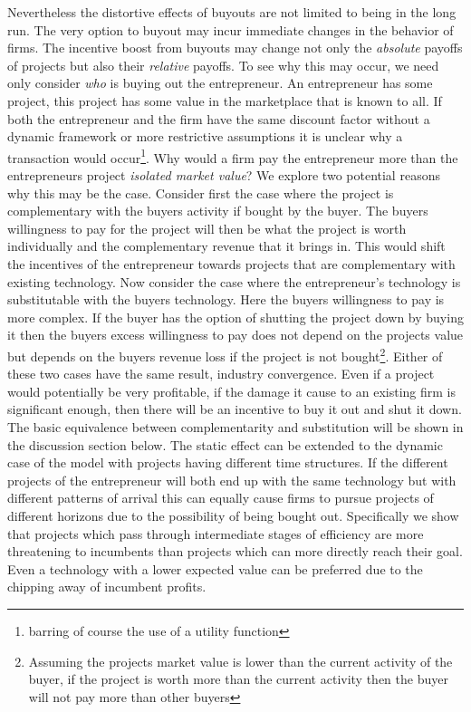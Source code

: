 \documentclass[12pt]{report}
\numberwithin{equation}{section}
\begin{document}
Nevertheless the distortive effects of buyouts are not limited to being in the long run. The very option to buyout may incur immediate changes in the behavior of firms. The incentive boost from buyouts may change not only the \textit{absolute} payoffs of projects but also their \textit{relative} payoffs. To see why this may occur, we need only consider \textit{who} is buying out the entrepreneur. An entrepreneur has some project, this project has some value in the marketplace that is known to all. If both the entrepreneur and the firm have the same discount factor without a dynamic framework or more restrictive assumptions it is unclear why a transaction would occur\footnote{barring of course the use of a utility function}. Why would a firm pay the entrepreneur more than the entrepreneurs project \textit{isolated market value}?  We explore two potential reasons why this may be the case.
Consider first the case where the project is complementary with the buyers activity if bought by the buyer. The buyers willingness to pay for the project will then be what the project is worth individually and the complementary revenue that it brings in. This would shift the incentives of the entrepreneur towards projects that are complementary with existing technology. 
Now consider the case where the entrepreneur's technology is substitutable with the buyers technology. Here the buyers willingness to pay is more complex. If the buyer has the option of shutting the project down by buying it then the buyers excess willingness to pay does not depend on the projects value but depends on the buyers revenue loss if the project is not bought\footnote{Assuming the projects market value is lower than the current activity of the buyer, if the project is worth more than the current activity then the buyer will not pay more than other buyers}.
Either of these two cases have the same result, industry convergence. Even if a project would potentially be very profitable, if the damage it cause to an existing firm is significant enough, then there will be an incentive to buy it out and shut it down. The basic equivalence between complementarity and substitution will be shown in the discussion section below. 
The static effect can be extended to the dynamic case of the model with projects having different time structures. If the different projects of the entrepreneur will both end up with the same technology but with different patterns of arrival this can equally cause firms to pursue projects of different horizons due to the possibility of being bought out. Specifically we show that projects which pass through intermediate stages of efficiency are more threatening to incumbents than projects which can more directly reach their goal. Even a technology with a lower expected value can be preferred due to the chipping away of incumbent profits. 
\end{document}
